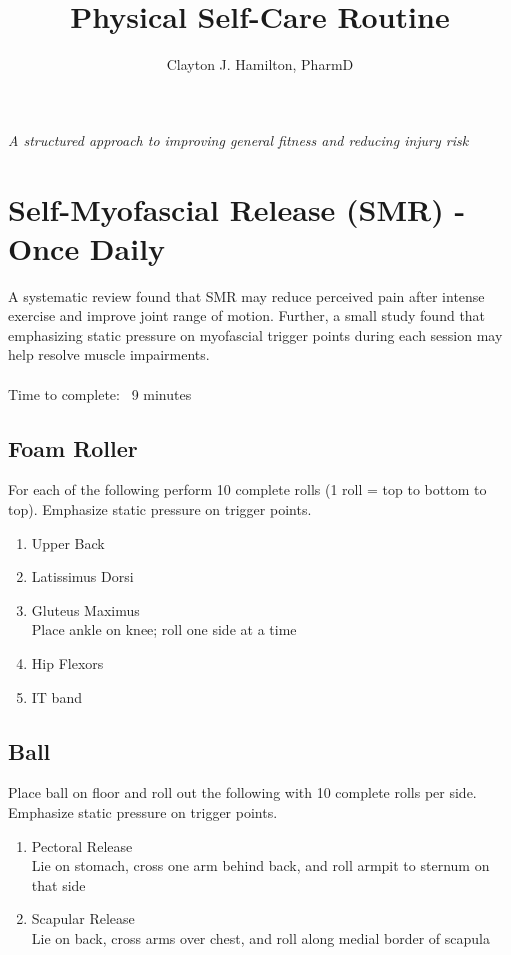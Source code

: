 \documentclass[12pt, letterpaper]{article}
\title{Physical Self-Care Routine}
\author{Clayton J. Hamilton, PharmD}
\date{}
\begin{document}
\maketitle

\centerline{\textit{A structured approach to improving general fitness and reducing injury risk}}

\tableofcontents

\newpage %


\section{Self-Myofascial Release (SMR) - Once Daily}

A systematic review found that SMR may reduce perceived pain after 
intense exercise and improve joint range of motion.\cite{pmid26618062} Further, a small study found that
 emphasizing static pressure on myofascial trigger points during each session may help resolve muscle impairments.\cite{pmid30765920} 
 \\
 \\
Time to complete: ~9 minutes

\subsection{Foam Roller}

For each of the following perform 10 complete rolls (1 roll = top to bottom to top). Emphasize static pressure on trigger points.
\begin{enumerate}
    \item Upper Back
    \item Latissimus Dorsi
    \item Gluteus Maximus \\ Place ankle on knee; roll one side at a time
    \item Hip Flexors
    \item IT band
\end{enumerate}

\subsection{Ball}
Place ball on floor and roll out the following with 10 complete rolls per side. Emphasize static pressure on trigger points.
\begin{enumerate}
    \item Pectoral Release \\ Lie on stomach, cross one arm behind back, and roll armpit to sternum on that side
    \item Scapular Release \\ Lie on back, cross arms over chest, and roll along medial border of scapula
\end{enumerate}
\end{document}
